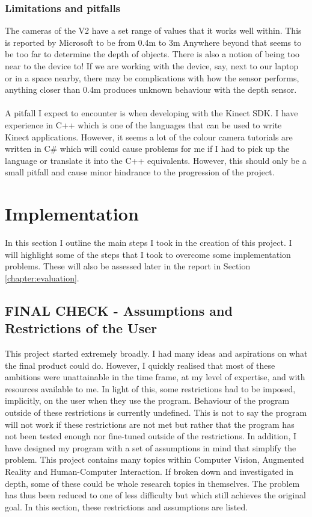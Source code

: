 \documentclass[11pt]{article}
\begin{document}
\subsubsection{Limitations and pitfalls}
The cameras of the V2 have a set range of values that it works well within.
This is reported by Microsoft to be from 0.4m to 3m
Anywhere beyond that seems to be too
far to determine the depth of objects. There is also a notion of being too near
to the device to! If we are working with the device, say, next to our laptop or
in a space nearby, there may be complications with how the sensor performs, 
anything closer than 0.4m produces unknown behaviour with the depth sensor.\\ 
\\
A pitfall I expect to encounter is when developing with the Kinect SDK. I have
experience in C++ which is one of the languages that can be used to write Kinect 
applications. However, it seems a lot of the colour camera tutorials are written
in C\# which will could cause problems for me if I had to pick up the language 
or translate it into the C++ equivalents. However, this should only be a small
pitfall and cause minor hindrance to the progression of the project.

\newpage

\section{Implementation}
\label{chapter:implementation}
In this section I outline the main steps I took in
the creation of this project. I will highlight some of the steps that I 
took to overcome some implementation problems. These will also be 
assessed later in the report in Section \ref{chapter:evaluation}.

\subsection{FINAL CHECK - Assumptions and Restrictions of the User}
\label{sec:assumptions}
This project started extremely broadly. I had many ideas and aspirations on
what the final product could do. However, I quickly realised that most
of these ambitions were unattainable in the time frame, at my level
of expertise, and with resources available to me. In light of this, 
some restrictions had to be imposed, implicitly, on the 
user when they use the program. Behaviour of the program outside of these
restrictions is currently undefined. This is not to say the program will not
work if these restrictions are not met but rather that the program has not been 
tested enough nor fine-tuned outside of the restrictions. 
In addition, I have designed my
program with a set of assumptions in mind that simplify the problem.
This project contains many topics within Computer Vision, 
Augmented Reality and Human-Computer
Interaction. If broken down and investigated in depth, some of these
could be whole research topics in themselves. The problem has thus been
reduced to one of less difficulty but which still achieves the original
goal. In this section, these restrictions and assumptions are listed. 
\end{document}
